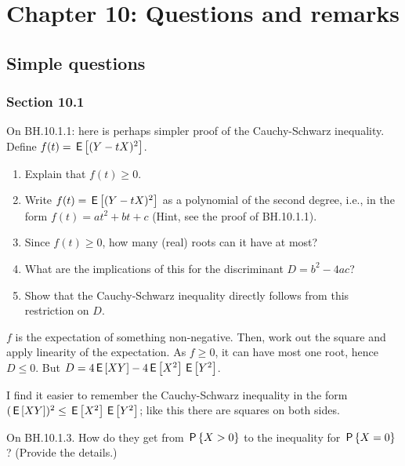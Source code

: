 


\chapter{Chapter 10: Questions and remarks}


\section{Simple questions}


\subsection*{Section 10.1}


\begin{exercise}
On BH.10.1.1:  here is perhaps simpler proof of the Cauchy-Schwarz inequality.  Define  $f(t) = \E{(Y-tX)^2}$.
\begin{enumerate}
\item Explain that $f(t)\geq 0$.
\item Write $f(t) = \E{(Y-tX)^2}$ as a polynomial of the second degree, i.e., in the form $f(t) = a t^2 + b t + c$  (Hint, see the proof of BH.10.1.1).
\item Since $f(t) \geq 0$, how many (real) roots can it have at most?
\item What are the implications of this for the discriminant $D=b^2-4ac$?
\item Show that the Cauchy-Schwarz inequality directly follows from this restriction on $D$.
\end{enumerate}
\begin{solution}
$f$ is the expectation of something non-negative. Then, work out the square and apply linearity of the expectation. As $f\geq 0$, it can have most one root, hence $D\leq 0$. But $D=4\E{XY} - 4\E{X^{2}}\E{Y^{2}}$.
\end{solution}
\end{exercise}

\begin{remark}
I find it easier to remember the Cauchy-Schwarz inequality in the form $(\E{XY})^2 \leq \E{X^2}\E{Y^2}$; like this there are squares on both sides.
\end{remark}

\begin{exercise}
On BH.10.1.3. How do they get from $\P{X>0}$ to the inequality for $\P{X=0}$? (Provide the details.)
\begin{hint}
\end{hint}
\begin{solution}
\end{solution}
\end{exercise}

